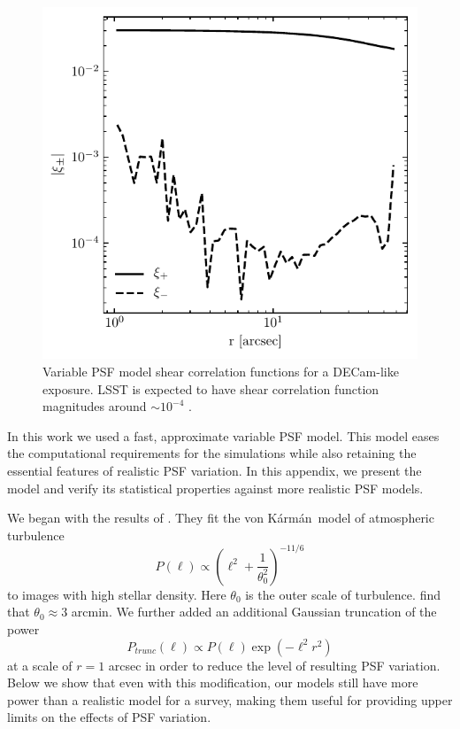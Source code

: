 \documentclass[fleqn,useAMS,usenatbib]{mnras}
\newcommand{\vonkarman}{{von K\'arm\'an}~}
\begin{document}
\begin{figure}
  \includegraphics[width=\columnwidth]{figures/psxi.pdf}
  \caption{
    Variable PSF model shear correlation functions for a DECam-like exposure. LSST
    is expected to have shear correlation function magnitudes around
    $\sim\!10^{-4}$ \citep{jee2011}.
    \label{fig:psxi}}
\end{figure}


In this work we used a fast, approximate variable PSF model. This model eases the
computational requirements for the simulations while also retaining the
essential features of realistic PSF variation. In this appendix, we present
the model and verify its statistical properties against more realistic PSF models.

We began with the results of \citet{heymans2012}. They fit the \vonkarman model
of atmospheric turbulence
\begin{displaymath}
  P(\ell) \propto \left(\ell^{2} + \frac{1}{\theta_{0}^2}\right)^{-11/6}
\end{displaymath}
to images with high stellar density. Here $\theta_{0}$ is the outer scale of
turbulence. \citep{heymans2012} find that $\theta_{0}\approx3$ arcmin.
We further added an additional Gaussian truncation of the power
\begin{displaymath}
  P_{trunc}(\ell) \propto P(\ell)\exp\left(-\ell^2r^{2}\right)
\end{displaymath}
at a scale of $r=1$ arcsec in order to reduce the level of resulting
PSF variation. Below we show that even with this modification, our models
still have more power than a realistic model for a survey, making them useful
for providing upper limits on the effects of PSF variation.
\end{document}
